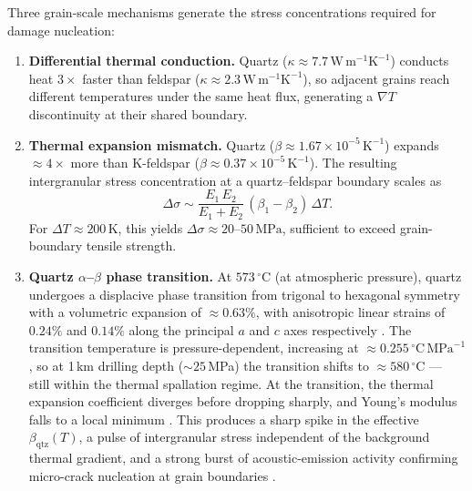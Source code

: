 \documentclass[12pt, a4paper]{article}
\begin{document}
Three grain-scale mechanisms generate the stress concentrations required for
damage nucleation:
\begin{enumerate}[noitemsep]
    \item \textbf{Differential thermal conduction.}  Quartz
    ($\kappa \approx 7.7\,\mathrm{W\,m^{-1}K^{-1}}$) conducts heat $3\times$
    faster than feldspar ($\kappa \approx 2.3\,\mathrm{W\,m^{-1}K^{-1}}$), so
    adjacent grains reach different temperatures under the same heat flux,
    generating a $\nabla T$ discontinuity at their shared boundary.

    \item \textbf{Thermal expansion mismatch.}  Quartz
    ($\beta \approx 1.67\times10^{-5}\,\mathrm{K}^{-1}$) expands $\approx
    4\times$ more than K-feldspar ($\beta \approx 0.37\times10^{-5}\,\mathrm{K}^{-1}$).
    The resulting intergranular stress concentration at a quartz--feldspar
    boundary scales as
    \begin{equation}
        \Delta\sigma \sim
        \frac{E_1\,E_2}{E_1+E_2}\,(\beta_1 - \beta_2)\,\Delta T.
        \label{eq:grain_stress}
    \end{equation}
    For $\Delta T \approx 200\,\mathrm{K}$, this yields $\Delta\sigma
    \approx 20$--$50\,\mathrm{MPa}$, sufficient to exceed grain-boundary
    tensile strength.

    \item \textbf{Quartz $\alpha$--$\beta$ phase transition.}  At
    $573\,^\circ\mathrm{C}$ (at atmospheric pressure), quartz undergoes a
    displacive phase transition from trigonal to hexagonal symmetry with a
    volumetric expansion of $\approx 0.63\%$, with anisotropic linear strains
    of $0.24\%$ and $0.14\%$ along the principal $a$ and $c$ axes respectively
    \citep{carpenter1998quartz, johnson2021quartz}.  The transition temperature
    is pressure-dependent, increasing at $\approx
    0.255\,^\circ\mathrm{C\,MPa}^{-1}$ \citep{shen1993quartz}, so at
    1\,km drilling depth ($\sim 25$\,MPa) the transition shifts to
    $\approx 580\,^\circ\mathrm{C}$ --- still within the thermal spallation
    regime.  At the transition, the thermal expansion coefficient diverges
    before dropping sharply, and Young's modulus falls to a local minimum
    \citep{haussuehl1960quartz}.  This produces a sharp spike in the effective
    $\beta_\mathrm{qtz}(T)$, a pulse of intergranular stress independent of
    the background thermal gradient, and a strong burst of acoustic-emission
    activity confirming micro-crack nucleation at grain boundaries
    \citep{griffin1995acoustic}.
\end{enumerate}
\end{document}
